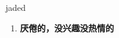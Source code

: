 
\begin{frame}
{\huge jaded}
\begin{center}
\begin{enumerate}\Large
  \item \textbf{厌倦的，没兴趣没热情的}
\end{enumerate}
\end{center}
\end{frame}
